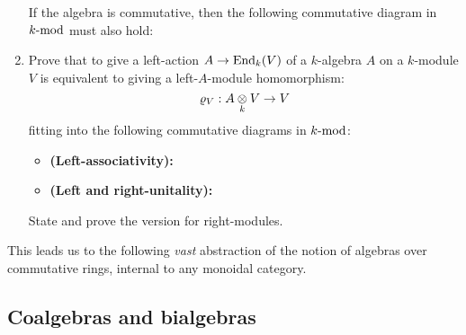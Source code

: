 \begin{question}
\begin{enumerate}
\begin{itemize}
                \end{itemize}
                If the algebra is commutative, then the following commutative diagram in $k\mod$ must also hold:
                \item Prove that to give a left-action $A \to \End_k(V)$ of a $k$-algebra $A$ on a $k$-module $V$ is equivalent to giving a left-$A$-module homomorphism:
                    $$\varrho_V: A \tensor_k V \to V$$
                fitting into the following commutative diagrams in $k\mod$:
                \begin{itemize}
                    \item \textbf{(Left-associativity):} 
                    \item \textbf{(Left and right-unitality):} 
                \end{itemize}
                    
                State and prove the version for right-modules.
            \end{enumerate}
        \end{question}

        This leads us to the following \textit{vast} abstraction of the notion of algebras over commutative rings, internal to any monoidal category.
        \begin{definition}[Algebras] \label{def: algebras}
        \end{definition}

    \subsection{Coalgebras and bialgebras}
        \begin{definition}[Coalgebras] \label{def: coalgebras}
        \end{definition}
        
        \begin{definition}[Bialgebras] \label{def: bialgebras}
        \end{definition}

        \begin{definition} \label{def: hopf_algebras}
        \end{definition}

